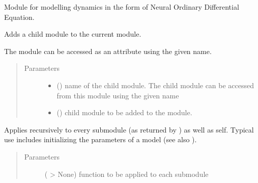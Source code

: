 \documentclass[letterpaper,10pt,english]{sphinxmanual}
\begin{document}
\begin{fulllineitems}
\label{\detokenize{api/dynamics:geology.metamodelling.dynamics.NeuralDifferentialEquation}}
Module for modelling dynamics in the form of Neural Ordinary Differential Equation.

\begin{fulllineitems}
\label{\detokenize{api/dynamics:geology.metamodelling.dynamics.NeuralDifferentialEquation.add_module}}
Adds a child module to the current module.

The module can be accessed as an attribute using the given name.
\begin{quote}\begin{description}
\item[{Parameters}] \leavevmode\begin{itemize}
\item {} 
 () \textendash{} name of the child module. The child module can be
accessed from this module using the given name

\item {} 
 () \textendash{} child module to be added to the module.

\end{itemize}

\end{description}\end{quote}

\end{fulllineitems}


\begin{fulllineitems}
\label{\detokenize{api/dynamics:geology.metamodelling.dynamics.NeuralDifferentialEquation.apply}}
Applies  recursively to every submodule (as returned by )
as well as self. Typical use includes initializing the parameters of a model
(see also ).
\begin{quote}\begin{description}
\item[{Parameters}] \leavevmode
{} ( \sphinxhyphen{}\textgreater{} None) \textendash{} function to be applied to each submodule


\end{description}
\end{quote}
\end{fulllineitems}
\end{fulllineitems}
\end{document}
